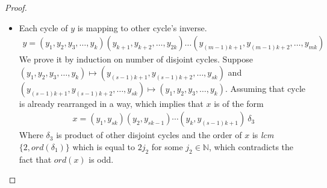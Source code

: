 \documentclass[oneside]{amsart}
\theoremstyle{plain}
\theoremstyle{definition}
\theoremstyle{remark}
\newcommand{\ord}{ord}
\newcommand{\lcm}{lcm}
\begin{document}
\begin{proof}
\begin{itemize}
\begin{itemize}
\begin{align*}
                        \ord(x) &= \lcm\{2, \ord(\delta_1)\} \text{ or } lcm\{2, \ord(\delta_2)\}\\
                        &= 2j_1 \text{ for some $j_1 \in \mathbb{N}$}
                    \end{align*}
                    which contradicts the fact that $\ord(x)$ is odd.
                    \item[Case (2).] Each cycle of $y$ is mapping to other cycle's inverse.
                    \begin{align*}
                        y = (y_1, y_2, y_3, \ldots, y_k)(y_{k + 1}, y_{k + 2}, \ldots, y_{2k}) \ldots (y_{(m - 1)k + 1}, y_{(m - 1)k + 2}, \ldots, y_{mk})
                    \end{align*}
                    We prove it by induction on number of disjoint cycles. Suppose $(y_1, y_2, y_3, \ldots , y_k) \mapsto (y_{(s- 1)k + 1}, y_{(s- 1)k + 2}, \ldots , y_{sk})$ and $(y_{(s- 1)k + 1}, y_{(s- 1)k + 2}, \ldots , y_{sk}) \mapsto (y_1, y_2, y_3, \ldots , y_k)$. Assuming that cycle is already rearranged in a way, which implies that $x$ is of the form
                    \begin{align*}
                        x = (y_1, y_{sk})(y_2, y_{sk - 1}) \cdots (y_k, y_{(s - 1)k + 1})\ \delta_3
                    \end{align*}
                    Where $\delta_3$ is product of other disjoint cycles and the order of $x$ is \textit{lcm}$\{2, \ord(\delta_1)\}$  which is equal to $2j_2$ for some $j_2 \in \mathbb{N}$, which contradicts the fact that $\ord(x)$ is odd.
    

\end{itemize}
\end{itemize}
\end{proof}
\end{document}

